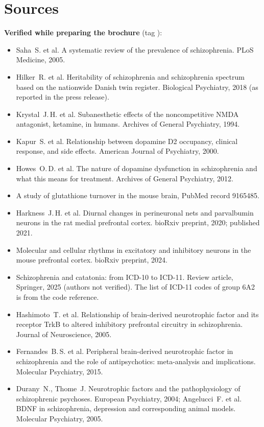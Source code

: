 \section{Sources}
{\small
\textbf{Verified while preparing the brochure} (tag \tP):
\begin{itemize}
\item Saha~S. et al. A systematic review of the prevalence of schizophrenia. PLoS Medicine, 2005.
\item Hilker~R. et al. Heritability of schizophrenia and schizophrenia spectrum based on the nationwide Danish twin register. Biological Psychiatry, 2018 (as reported in the press release).
\item Krystal~J.\,H. et al. Subanesthetic effects of the noncompetitive NMDA antagonist, ketamine, in humans. Archives of General Psychiatry, 1994.
\item Kapur~S. et al. Relationship between dopamine D2 occupancy, clinical response, and side effects. American Journal of Psychiatry, 2000.
\item Howes~O.\,D. et al. The nature of dopamine dysfunction in schizophrenia and what this means for treatment. Archives of General Psychiatry, 2012.
\item A study of glutathione turnover in the mouse brain, PubMed record 9165485.
\item Harkness~J.\,H. et al. Diurnal changes in perineuronal nets and parvalbumin neurons in the rat medial prefrontal cortex. bioRxiv preprint, 2020; published 2021.
\item Molecular and cellular rhythms in excitatory and inhibitory neurons in the mouse prefrontal cortex. bioRxiv preprint, 2024.
\item Schizophrenia and catatonia: from ICD-10 to ICD-11. Review article, Springer, 2025 (authors not verified). The list of ICD-11 codes of group 6A2 is from the code reference.
\item Hashimoto~T. et al. Relationship of brain-derived neurotrophic factor and its receptor TrkB to altered inhibitory prefrontal circuitry in schizophrenia. Journal of Neuroscience, 2005.
\item Fernandes~B.\,S. et al. Peripheral brain-derived neurotrophic factor in schizophrenia and the role of antipsychotics: meta-analysis and implications. Molecular Psychiatry, 2015.
\item Durany~N., Thome~J. Neurotrophic factors and the pathophysiology of schizophrenic psychoses. European Psychiatry, 2004; Angelucci~F. et al. BDNF in schizophrenia, depression and corresponding animal models. Molecular Psychiatry, 2005.

\end{itemize}}
